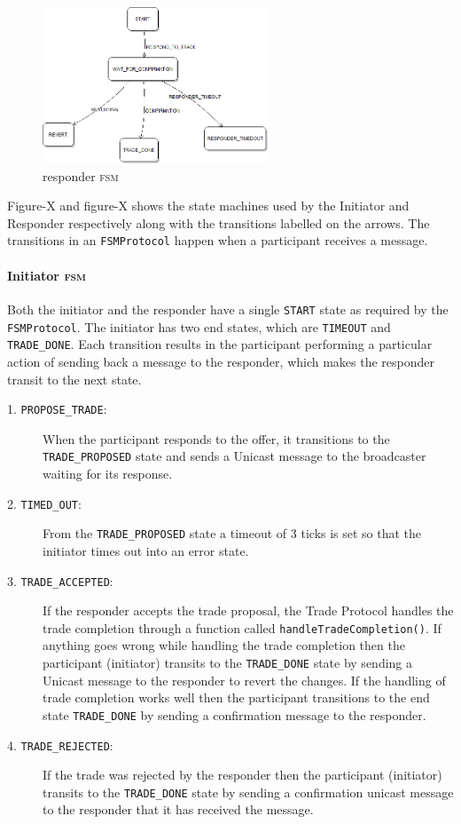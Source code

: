 \begin{figure}[h!]
	\centering
	\includegraphics[width=0.6\textwidth]{img/protocol-fsm-2.png}
	\caption{responder \textsc{fsm}}
	\label{fig:protocol-fsm-2}
\end{figure}

Figure-X and figure-X shows the state machines used by the Initiator and Responder respectively along with the transitions labelled on the arrows. The transitions in an \texttt{FSMProtocol} happen when a participant receives a message.

\paragraph{Initiator \textsc{fsm}}

Both the initiator and the responder have a single \texttt{START} state as required by the \texttt{FSMProtocol}. The initiator has two end states, which are \texttt{TIMEOUT} and \texttt{TRADE\_DONE}. Each transition results in the participant performing a particular action of sending back a message to the responder, which makes the responder transit to the next state.

\begin{description}
	\item[1. \texttt{PROPOSE\_TRADE}:]
	When the participant responds to the offer, it transitions to the \texttt{TRADE\_PROPOSED} state and sends a Unicast message to the broadcaster waiting for its response.
	\item[2. \texttt{TIMED\_OUT}:]
	From the \texttt{TRADE\_PROPOSED} state a timeout of 3 ticks is set so that the initiator times out into an error state.
	\item[3. \texttt{TRADE\_ACCEPTED}:]
	If the responder accepts the trade proposal, the Trade Protocol handles the trade completion through a function called \texttt{handleTradeCompletion()}. If anything goes wrong while handling the trade completion then the participant (initiator) transits to the \texttt{TRADE\_DONE} state by sending a Unicast message to the responder to revert the changes. If the handling of trade completion works well then the participant transitions to the end state \texttt{TRADE\_DONE} by sending a confirmation message to the responder.
	\item[4. \texttt{TRADE\_REJECTED}:]
	If the trade was rejected by the responder then the participant (initiator) transits to the \texttt{TRADE\_DONE} state by sending a confirmation unicast message to the responder that it has received the message.
\end{description}

